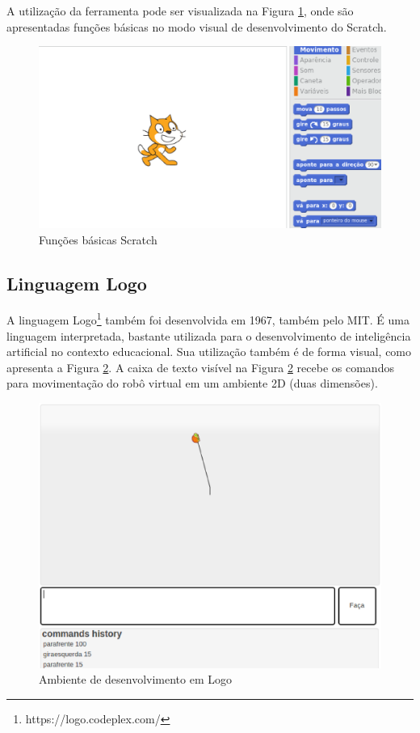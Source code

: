 		A utilização da ferramenta pode ser visualizada na Figura \ref{img:funcoesBasicasScratch}, onde são apresentadas funções básicas no modo visual de desenvolvimento do Scratch.

		\begin{figure}[H]
			\centering
			\includegraphics[scale=0.7]{figuras/funcoesBasicasSratch.eps}
			\caption[Funções básicas Scratch]{Funções básicas Scratch}
			\label{img:funcoesBasicasScratch}
		\end{figure}

	\subsection{Linguagem Logo} %
	\label{sub:linguagem_logo}

		A linguagem Logo\footnote{https://logo.codeplex.com/} também foi desenvolvida em 1967, também pelo MIT. É uma linguagem interpretada, bastante utilizada para o desenvolvimento de inteligência artificial no contexto educacional. Sua utilização também é de forma visual, como apresenta a Figura \ref{img:ambienteLogo}. A caixa de texto visível na Figura \ref{img:ambienteLogo} recebe os comandos para movimentação do robô virtual em um ambiente 2D (duas dimensões).

		\begin{figure}[H]
			\centering
			\includegraphics[scale=0.7]{figuras/ambienteLogo.eps}
			\caption[Ambiente de desenvolvimento em Logo]{Ambiente de desenvolvimento em Logo}
			\label{img:ambienteLogo}
		\end{figure}


